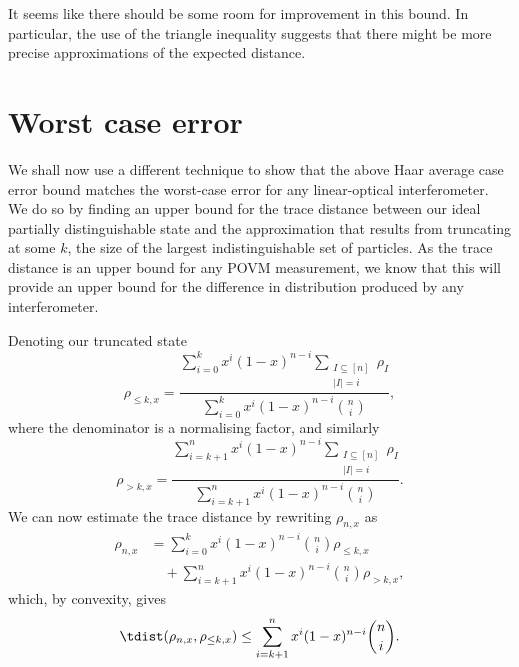 It seems like there should be some room for improvement in this bound. 
In particular, the use of the triangle inequality suggests that there might be more precise approximations of the expected distance.

\section{Worst case error}
\label{sec:worst-case}

We shall now use a different technique to show that the above Haar average case error bound matches the worst-case error for any linear-optical interferometer. We do so by finding an upper bound for the trace distance between our ideal partially distinguishable state and the approximation that results from truncating at some $k$, the size of the largest indistinguishable set of particles.
As the trace distance is an upper bound for any POVM measurement, we know that this will provide an upper bound for the difference in distribution produced by any interferometer.

Denoting our truncated state
\begin{equation}
\rho_{\leq k,x} = \frac{\sum_{i=0}^kx^i(1-x)^{n-i}\sum_{\substack{I\subseteq[n]\\|I|=i}}\rho_I}{\sum_{i=0}^kx^i(1-x)^{n-i}\binom{n}{i}},
\end{equation}
where the denominator is a normalising factor, and similarly
\begin{equation}
\rho_{>k,x} = \frac{\sum_{i=k+1}^nx^i(1-x)^{n-i}\sum_{\substack{I\subseteq[n]\\|I|=i}}\rho_I}{\sum_{i=k+1}^nx^i(1-x)^{n-i}\binom{n}{i}}.
\end{equation}
We can now estimate the trace distance by rewriting $\rho_{n,x}$ as
\begin{align}
\rho_{n,x}
&=\sum_{i=0}^kx^i(1-x)^{n-i}\binom{n}{i} \rho_{\leq k,x} \\
&\quad+\sum_{i=k+1}^nx^i(1-x)^{n-i}\binom{n}{i} \rho_{>k,x} ,
\end{align}
which, by convexity, gives
\begin{equation}
\tdist(\rho_{n,x},\rho_{\leq k,x}) \leq \sum_{i=k+1}^nx^i(1-x)^{n-i}\binom{n}{i}\label{eqn:error-sum}.
\end{equation}

